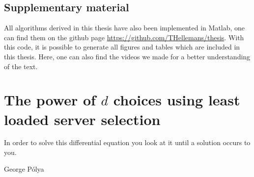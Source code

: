 \documentclass[12pt]{report}
\begin{document}
\section{Supplementary material}
All algorithms derived in this thesis have also been implemented in Matlab, one can find them on the github page \href{https://github.com/THellemans/thesis}{https://github.com/THellemans/thesis}. With this code, it is possible to generate all figures and tables which are included in this thesis. Here, one can also find the videos we made for a better understanding of the text.

\chapter{The power of $d$ choices using least loaded server selection} \label{chap:LLd}
\epigraph{In order to solve this differential equation you look at it until a solution occurs to you.}{George Pólya}
\end{document}
